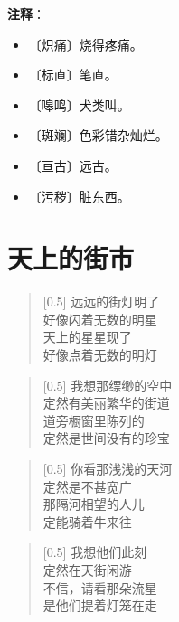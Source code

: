\documentclass[12pt,UTF-8,openany]{ctexbook}
\begin{document}
\newpage

\textbf{注释}：

\vspace{-1em}

\begin{itemize}
    \setlength\itemsep{-0.2em}
    \item 〔炽痛〕烧得疼痛。
    \item 〔标直〕笔直。
    \item 〔嗥鸣〕犬类叫。
    \item 〔斑斓〕色彩错杂灿烂。
    \item 〔亘古〕远古。
    \item 〔污秽〕脏东西。
\end{itemize}

\chapter{天上的街市}

\begin{normalsize}
    
    \begin{verse}[0.5\linewidth]
        远远的街灯明了 \\
        好像闪着无数的明星 \\
        天上的星星现了 \\
        好像点着无数的明灯
    \end{verse}
    
    
    \begin{verse}[0.5\linewidth]
        我想那缥缈的空中 \\
        定然有美丽繁华的街道 \\
        道旁橱窗里陈列的 \\
        定然是世间没有的珍宝
    \end{verse}
    
    
    \begin{verse}[0.5\linewidth]
        你看那浅浅的天河 \\
        定然是不甚宽广 \\
        那隔河相望的人儿 \\
        定能骑着牛来往
    \end{verse}
    
    
    \begin{verse}[0.5\linewidth]
        我想他们此刻 \\
        定然在天街闲游 \\
        不信，请看那朵流星 \\
        是他们提着灯笼在走
    \end{verse}
    
\end{normalsize}
\end{document}

